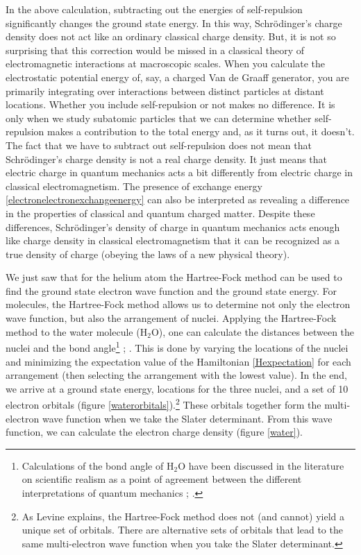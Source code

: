 \documentclass[12pt,onecolumn,secnumarabic,amsmath,amssymb,balancelastpage,nofootinbib]{article}
\begin{document}
In the above calculation, subtracting out the energies of self-repulsion significantly changes the ground state energy.  In this way, Schr\"{o}dinger's charge density does not act like an ordinary classical charge density.  But, it is not so surprising that this correction would be missed in a classical theory of electromagnetic interactions at macroscopic scales.  When you calculate the electrostatic potential energy of, say, a charged Van de Graaff generator, you are primarily integrating over interactions between distinct particles at distant locations.  Whether you include self-repulsion or not makes no difference.  It is only when we study subatomic particles that we can determine whether self-repulsion makes a contribution to the total energy and, as it turns out, it doesn't.  The fact that we have to subtract out self-repulsion does not mean that Schr\"{o}dinger's charge density is not a real charge density.  It just means that electric charge in quantum mechanics acts a bit differently from electric charge in classical electromagnetism.  The presence of exchange energy \eqref{electronelectronexchangeenergy} can also be interpreted as revealing a difference in the properties of classical and quantum charged matter.  Despite these differences, Schr\"{o}dinger's density of charge in quantum mechanics acts enough like charge density in classical electromagnetism that it can be recognized as a true density of charge (obeying the laws of a new physical theory).

We just saw that for the helium atom the Hartree-Fock method can be used to find the ground state electron wave function and the ground state energy.  For molecules, the Hartree-Fock method allows us to determine not only the electron wave function, but also the arrangement of nuclei.  Applying the Hartree-Fock method to the water molecule (H$_2$O), one can calculate the distances between the nuclei and the bond angle\footnote{Calculations of the bond angle of H$_2$O have been discussed in the literature on scientific realism as a point of agreement between the different interpretations of quantum mechanics \cite[pg.\ S309]{cordero2001}; \cite[sec.\ 4.5.2]{callender2020}.} \cite[pg.\ 202]{szaboQC}; \cite[sec.\ 15.5]{levineQC}.  This is done by varying the locations of the nuclei and minimizing the expectation value of the Hamiltonian \eqref{Hexpectation} for each arrangement (then selecting the arrangement with the lowest value).  In the end, we arrive at a ground state energy, locations for the three nuclei, and a set of 10 electron orbitals (figure \ref{waterorbitals}).\footnote{As Levine \cite[sec.\ 15.8]{levineQC} explains, the Hartree-Fock method does not (and cannot) yield a unique set of orbitals.  There are alternative sets of orbitals that lead to the same multi-electron wave function when you take the Slater determinant.\label{waterfootnote}}  These orbitals together form the multi-electron wave function when we take the Slater determinant.  From this wave function, we can calculate the electron charge density (figure \ref{water}).
\end{document}

